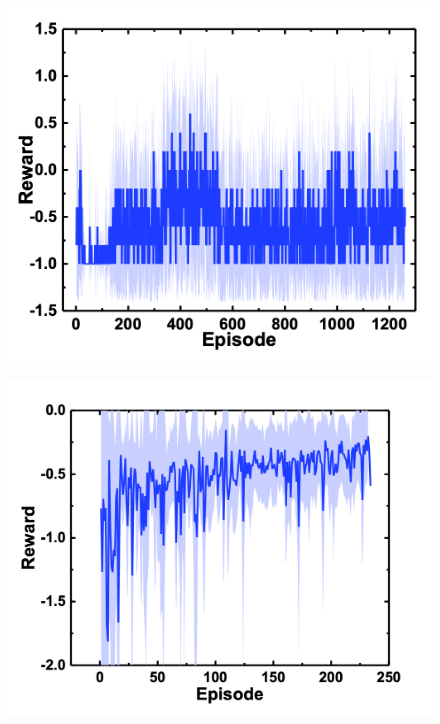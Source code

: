 \begin{figure}[H]
    \centering
    \begin{minipage}[t]{0.45\linewidth}
        \centering
        \includegraphics[width=\linewidth]{figure/chapter3/rew=01_obs=面積重心_origin}
        \label{fig:報酬離散}
    \end{minipage}
    \hspace*{\fill}
    \begin{minipage}[t]{0.45\linewidth}
        \centering
        \includegraphics[width=1.1\linewidth]{figure/chapter3/QL_rew=distance_obs=posvec_origin}

\end{minipage}
\end{figure}
